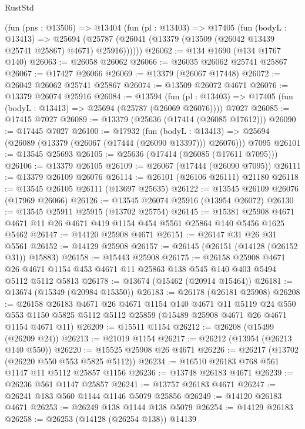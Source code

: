 \begin{lexlean}{RustStd}
\begin{coremodule}
    (fun (pns : @13506) =>
    @13404
      (fun (pl : @13403) =>
      @17405
        (fun (bodyL : @13413) =>
        @25694 (@25787 (@26041 (@13379 (@13509 (@26042 @13439 @25741 @25867) @4671) @25916))))))
@26062 := @134 @1690 (@134 @1767 @140)
@26063 := @26058 @26062
@26066 := @26035 @26062 @25741 @25867
@26067 := @17427 @26066
@26069 := @13379 (@26067 @17448)
@26072 := @26042 @26062 @25741 @25867
@26074 := @13509 @26072 @4671
@26076 := @13379 @26074 @25916
@26084 := @13594
    (fun (pl : @13403) => @17405 (fun (bodyL : @13413) => @25694 (@25787 (@26069 @26076))))
    @7027
@26085 := @17415 @7027
@26089 := @13379 (@25636 (@17414 (@26085 @17612)))
@26090 := @17445 @7027
@26100 := @17932
    (fun (bodyL : @13413) => @25694 (@26089 (@13379 (@26067 (@17444 (@26090 @13397))) @26076)))
    @7095
@26101 := @13545 @25693
@26105 := @25636 (@17414 (@26085 (@17611 @7095)))
@26106 := @13379 @26105
@26109 := @26067 (@17444 (@26090 @7095))
@26111 := @13379 @26109 @26076
@26114 := @26101 (@26106 @26111) @21180
@26118 := @13545 @26105 @26111 (@13697 @25635)
@26122 := @13545 @26109 @26076 (@17969 @26066)
@26126 := @13545 @26074 @25916 (@13954 @26072)
@26130 := @13545 @25911 @25915 (@13702 @25754)
@26145 := @15381
    @25908
    @4671
    @4671
    @11
    @26
    @4671
    @419
    @1154
    @454
    @5561
    @25864
    @140
    @5456
    @1625
    @5462
@26147 := @14120 @25908 @4671
@26151 := @26147 @31 @26 @31 @5561
@26152 := @14129 @25908
@26157 := @26145 (@26151 (@14128 (@26152 @31)) @15883)
@26158 := @15443 @25908
@26175 := @26158
    @25908
    @4671
    @26
    @4671
    @1154
    @453
    @4671
    @11
    @25863
    @138
    @545
    @140
    @403
    @5494
    @5112
    @5112
    @5813
@26178 := @13674 (@15462 (@20914 @15464))
@26181 := @13674 (@15349 (@20984 @15350))
@26183 := @26178 (@26181 @25908)
@26208 := @26158
    @26183
    @4671
    @26
    @4671
    @1154
    @140
    @4671
    @11
    @5119
    @24
    @550
    @553
    @1150
    @5825
    @5112
    @5112
    @25859
    (@15489 @25908 @4671 @26 @4671 @1154 @4671 @11)
@26209 := @15511 @1154
@26212 := @26208 (@15499 (@26209 @24))
@26213 := @21019 @1154
@26217 := @26212 (@13954 (@26213 @140 @550))
@26220 := @15525 @25908 @26 @4671
@26226 := @26217 (@13702 (@26220 @550 @553 @5825 @5112))
@26234 := @16510 @26183 @768 @561 @1147 @11 @5112 @25857 @1156
@26236 := @13748 @26183 @4671
@26239 := @26236 @561 @1147 @25857
@26241 := @13757 @26183 @4671
@26247 := @26241 @183 @560 @1144 @1146 @5079 @25856
@26249 := @14120 @26183 @4671
@26253 := @26249 @138 @1144 @138 @5079
@26254 := @14129 @26183
@26258 := @26253 (@14128 (@26254 @138)) @14139

\end{coremodule}
\end{lexlean}
